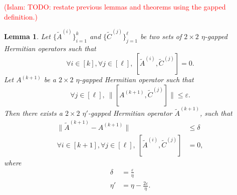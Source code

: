 \documentclass[11pt]{article}
\theoremstyle{plain}
\newtheorem{lemma}[theorem]{Lemma}
\newcommand{\eps}{\varepsilon}
\newcommand{\IslamNote}[1]{\textcolor{red}{(Islam: #1)}}
\newcommand{\IslamNote}[1]{}
\begin{document}
\IslamNote{TODO: restate previous lemmas and theorems using the gapped definition.}
\newcommand{\tdA}{\tilde{A}}
\newcommand{\tdC}{\tilde{C}}
\begin{lemma}\label{lem:iterative-pinching}
    Let $\{\tdA^{(i)}\}_{i=1}^{k}$ and $\{\tdC^{(j)}\}_{j=1}^{\ell}$ be two sets of $2\times 2$ $\eta$-gapped Hermitian operators such that 
    \begin{equation} \forall i \in [k], \forall j \in [\ell], \: [\tdA^{(i)}, \tdC^{(j)}] = 0. \end{equation}
    Let $A^{(k+1)}$ be a $2\times 2$ $\eta$-gapped Hermitian operator such that 
    \begin{equation} \forall j \in [\ell],\: \|[A^{(k+1)}, \tdC^{(j)}] \| \leq \eps. \end{equation}
    Then there exists a $2\times 2$ $\eta'$-gapped Hermitian operator $\tdA^{(k+1)}$, such that
    \begin{align}
       \| \tdA^{(k+1)} - A^{(k+1)}\| &\leq \delta \label{eq:Aprime-A-close} \\
        \forall i \in [k+1], \forall j \in [\ell], \: [\tdA^{(i)}, \tdC^{(j)}] &= 0, \label{eq:prime-commutator}
    \end{align}
    where
    \begin{align}
        \delta &= \frac{\eps}{\eta} \\
        \eta' &= \eta - \frac{2\eps}{\eta}. 
    \end{align}
\end{lemma}
\end{document}
